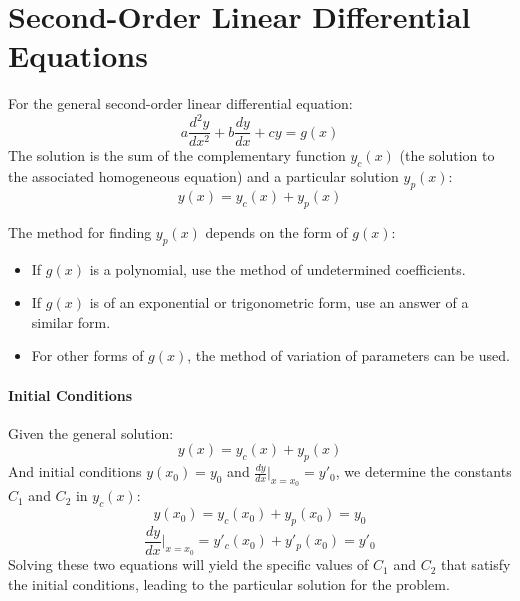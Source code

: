 \documentclass[]{article}
\begin{document}
	\section{Second-Order Linear Differential Equations}
	
	For the general second-order linear differential equation:
	$$
	a\frac{d^2y}{dx^2} + b\frac{dy}{dx} + cy = g(x)
	$$
	The solution is the sum of the complementary function $y_c(x)$
	(the solution to the associated homogeneous equation)
	and a particular solution $y_p(x)$:
	$$
	y(x) = y_c(x) + y_p(x)
	$$
	
	The method for finding $y_p(x)$ depends on the form of $g(x)$:
	\begin{itemize}
		\item If $g(x)$ is a polynomial, use the method of undetermined coefficients.
		\item If $g(x)$ is of an exponential or trigonometric form, use an answer of a similar form.
		\item For other forms of $g(x)$, the method of variation of parameters can be used.
	\end{itemize}
	
	\paragraph{Initial Conditions}
	
	Given the general solution:
	$$
	y(x) = y_c(x) + y_p(x)
	$$
	And initial conditions $y(x_0) = y_0$ and $\frac{dy}{dx}\Big|_{x=x_0} = y'_0$, we determine the constants $C_1$ and $C_2$ in $y_c(x)$:
	$$
	y(x_0) = y_c(x_0) + y_p(x_0) = y_0
	$$
	$$
	\frac{dy}{dx}\Big|_{x=x_0} = y'_c(x_0) + y'_p(x_0) = y'_0
	$$
	Solving these two equations will yield the specific values of $C_1$ and $C_2$ that satisfy the initial conditions, leading to the particular solution for the problem.
	
	
\end{document}
